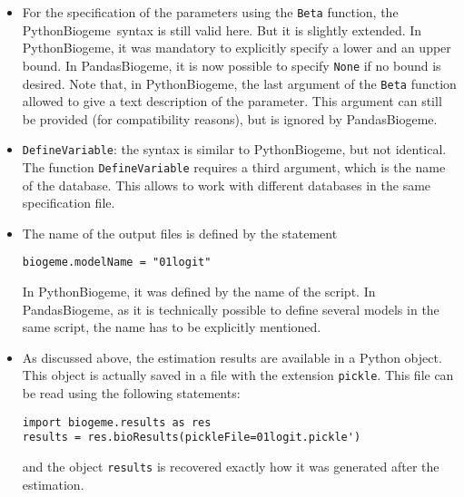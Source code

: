 \documentclass[12pt,a4paper]{article}
\newcommand{\PBIOGEME}{PythonBiogeme}
\newcommand{\PDBIOGEME}{PandasBiogeme}
\begin{document}
\begin{itemize}
\item For the specification of the parameters using the
  \lstinline+Beta+ function, the \PBIOGEME\ syntax is still valid here. But it is
slightly extended. In \PBIOGEME, it was mandatory to explicitly specify  a
lower and an upper bound. In \PDBIOGEME, it is now possible to specify
\lstinline+None+ if no bound is desired.  Note that, in \PBIOGEME, the
last argument of the \lstinline+Beta+ function allowed to give a text
description of the parameter. This argument can still be provided (for
compatibility reasons), but is ignored by \PDBIOGEME.
\item \lstinline+DefineVariable+: the syntax is similar to \PBIOGEME, but not identical. The function
\lstinline+DefineVariable+ requires a third argument, which is the
name of the database. This allows to work with different databases in
the same specification file.
\item The name of the output files is defined by the statement
\begin{lstlisting}[style=nonumbers]
biogeme.modelName = "01logit"
\end{lstlisting}
In \PBIOGEME, it was defined by the name of the script. In \PDBIOGEME,
as it is technically possible to define several models in the same
script, the name has to be explicitly mentioned.
\item As discussed above, the estimation results are available in a
  Python object. This object is actually saved in a file with the
  extension \lstinline+pickle+. This file can be read using the
  following statements:
\begin{lstlisting}[style=nonumbers]
import biogeme.results as res
results = res.bioResults(pickleFile=01logit.pickle')
\end{lstlisting}
and the object \lstinline+results+ is recovered exactly how it was
generated after the estimation. 
\end{itemize}
\end{document}
